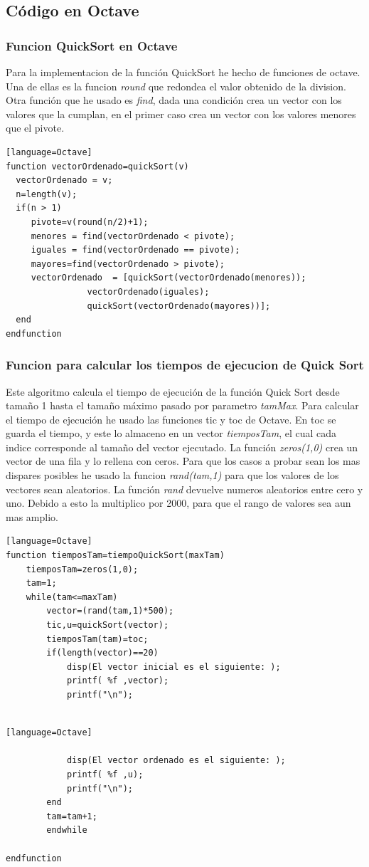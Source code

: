 \documentclass[a4,12pt]{article}
\begin{document}
\subsection{Código en Octave}
\subsubsection{Funcion QuickSort en Octave}
Para la implementacion de la función QuickSort he hecho de funciones de octave. Una de ellas es la funcion \emph{round} que redondea el valor obtenido de la division. Otra función que he usado es \emph{find}, dada una condición crea un vector con los valores que la cumplan, en el primer caso crea un vector con los valores menores que el pivote.
\bigskip %
\lstset{language=Octave}
\begin{lstlisting}[frame=single][language=Octave]
function vectorOrdenado=quickSort(v)     
  vectorOrdenado = v;
  n=length(v);
  if(n > 1)          
     pivote=v(round(n/2)+1);             
     menores = find(vectorOrdenado < pivote); 
     iguales = find(vectorOrdenado == pivote);
     mayores=find(vectorOrdenado > pivote);
     vectorOrdenado  = [quickSort(vectorOrdenado(menores));
     			vectorOrdenado(iguales); 
     			quickSort(vectorOrdenado(mayores))];
  end
endfunction
\end{lstlisting}
\subsubsection{Funcion para calcular los tiempos de ejecucion de Quick Sort}
Este algoritmo calcula el tiempo de ejecución de la función Quick Sort desde tamaño 1 hasta el tamaño máximo pasado por parametro \emph {tamMax}. Para calcular el tiempo de ejecución he usado las funciones tic y toc de Octave. En toc se guarda el tiempo, y este lo almaceno en un vector \emph{tiemposTam}, el cual cada indice corresponde al tamaño del vector ejecutado.
La función \emph{zeros(1,0)} crea un vector de una fila y lo rellena con ceros.
Para que los casos a probar sean los mas dispares posibles he usado la funcion \emph{rand(tam,1)} para que los valores de los vectores sean aleatorios. La función \emph{rand} devuelve numeros aleatorios entre cero y uno. Debido a esto la multiplico por 2000, para que el rango de valores sea aun mas amplio.
\bigskip %
\lstset{language=Octave}
\begin{lstlisting}[frame=single][language=Octave]
function tiemposTam=tiempoQuickSort(maxTam)
	tiemposTam=zeros(1,0);
	tam=1;
	while(tam<=maxTam)
		vector=(rand(tam,1)*500);	
		tic,u=quickSort(vector); 
		tiemposTam(tam)=toc;
		if(length(vector)==20)
			disp(El vector inicial es el siguiente: );
			printf( %f ,vector);
			printf("\n");
			
			\end{lstlisting}
			\begin{lstlisting}[frame=single][language=Octave]
			
			disp(El vector ordenado es el siguiente: );
			printf( %f ,u);
			printf("\n");
		end
		tam=tam+1;
		endwhile

endfunction
\end{lstlisting}
\end{document}
